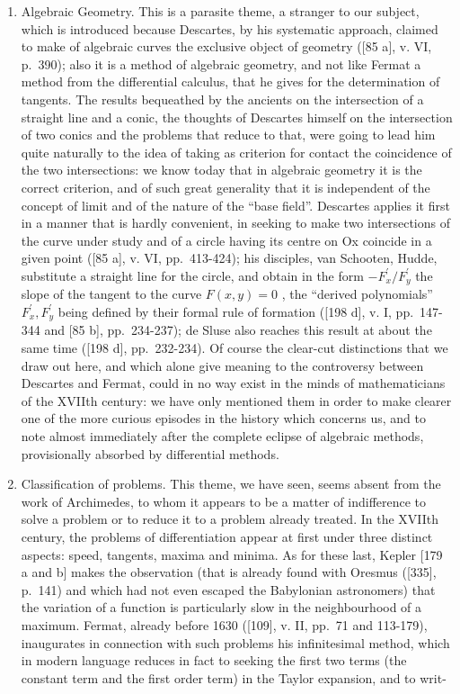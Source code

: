 \begin{enumerate}
\def\labelenumi{\Alph{enumi})}
\setcounter{enumi}{2}
\item
  Algebraic Geometry. This is a parasite theme, a stranger to our subject, which is introduced because Descartes, by his systematic approach, claimed to make of algebraic curves the exclusive object of geometry ({[}85 a{]}, v. VI, p.~390); also it is a method of algebraic geometry, and not like Fermat a method from the differential calculus, that he gives for the determination of tangents. The results bequeathed by the ancients on the intersection of a straight line and a conic, the thoughts of Descartes himself on the intersection of two conics and the problems that reduce to that, were going to lead him quite naturally to the idea of taking as criterion for contact the coincidence of the two intersections: we know today that in algebraic geometry it is the correct criterion, and of such great generality that it is independent of the concept of limit and of the nature of the ``base field''. Descartes applies it first in a manner that is hardly convenient, in seeking to make two intersections of the curve under study and of a circle having its centre on Ox coincide in a given point ({[}85 a{]}, v. VI, pp.~413-424); his disciples, van Schooten, Hudde, substitute a straight line for the circle, and obtain in the form \(-F_{x}^{\prime}/F_{y}^{\prime}\) the slope of the tangent to the curve \(F(x,y)=0\) , the ``derived polynomials'' \(F_{x}^{\prime}, F_{y}^{\prime}\) being defined by their formal rule of formation ({[}198 d{]}, v. I, pp.~147-344 and {[}85 b{]}, pp.~234-237); de Sluse also reaches this result at about the same time ({[}198 d{]}, pp.~232-234). Of course the clear-cut distinctions that we draw out here, and which alone give meaning to the controversy between Descartes and Fermat, could in no way exist in the minds of mathematicians of the XVIIth century: we have only mentioned them in order to make clearer one of the more curious episodes in the history which concerns us, and to note almost immediately after the complete eclipse of algebraic methods, provisionally absorbed by differential methods.
\item
  Classification of problems. This theme, we have seen, seems absent from the work of Archimedes, to whom it appears to be a matter of indifference to solve a problem or to reduce it to a problem already treated. In the XVIIth century, the problems of differentiation appear at first under three distinct aspects: speed, tangents, maxima and minima. As for these last, Kepler {[}179 a and b{]} makes the observation (that is already found with Oresmus ({[}335{]}, p.~141) and which had not even escaped the Babylonian astronomers) that the variation of a function is particularly slow in the neighbourhood of a maximum. Fermat, already before 1630 ({[}109{]}, v. II, pp.~71 and 113-179), inaugurates in connection with such problems his infinitesimal method, which in modern language reduces in fact to seeking the first two terms (the constant term and the first order term) in the Taylor expansion, and to writ-
\end{enumerate}

